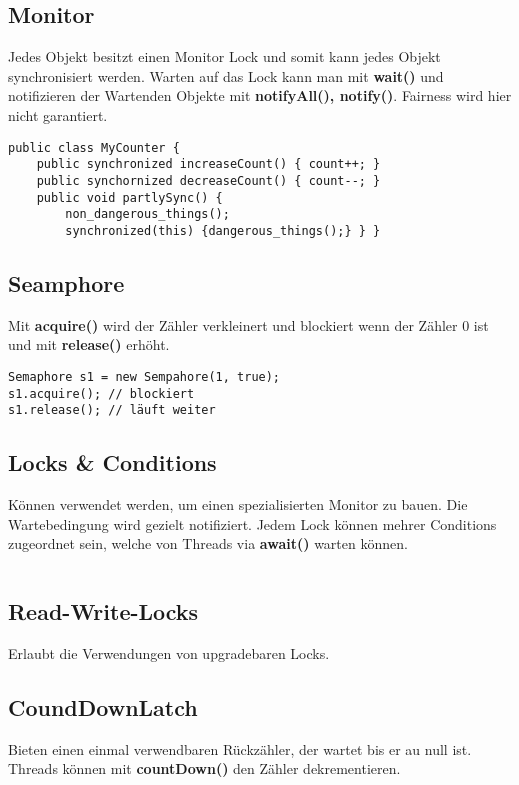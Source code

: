 \subsection{Monitor}
Jedes Objekt besitzt einen Monitor Lock und somit kann jedes Objekt synchronisiert werden. Warten auf das Lock kann man mit \textbf{wait()} und notifizieren der Wartenden Objekte mit \textbf{notifyAll(), notify()}. Fairness wird hier nicht garantiert.

\begin{lstlisting}[style=Java]
public class MyCounter {
	public synchronized increaseCount() { count++; }
	public synchornized decreaseCount() { count--; }
	public void partlySync() {
		non_dangerous_things();
		synchronized(this) {dangerous_things();} } }
\end{lstlisting}

\subsection{Seamphore}
Mit \textbf{acquire()} wird der Zähler verkleinert und blockiert wenn der Zähler 0 ist und mit \textbf{release()} erhöht.

\begin{lstlisting}[style=Java]
Semaphore s1 = new Sempahore(1, true);
s1.acquire(); // blockiert
s1.release(); // läuft weiter
\end{lstlisting}

\subsection{Locks \& Conditions}
Können verwendet werden, um einen spezialisierten Monitor zu bauen. Die Wartebedingung wird gezielt notifiziert. Jedem Lock können mehrer Conditions zugeordnet sein, welche von Threads via \textbf{await()} warten können.

\begin{lstlisting}[style=Java]

\end{lstlisting}

\subsection{Read-Write-Locks}
Erlaubt die Verwendungen von upgradebaren Locks. 


\subsection{CoundDownLatch}
Bieten einen einmal verwendbaren Rückzähler, der wartet bis er au null ist. Threads können mit \textbf{countDown()} den Zähler dekrementieren. 

